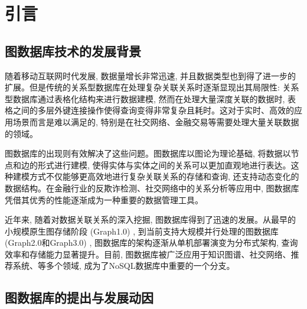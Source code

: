 \section{引言}

\subsection{图数据库技术的发展背景}

随着移动互联网时代发展, 数据量增长非常迅速, 并且数据类型也到得了进一步的扩展。但是传统的关系型数据库在处理复杂关联关系时逐渐显现出其局限性: 关系型数据库通过表格化结构来进行数据建模, 然而在处理大量深度关联的数据时, 表格之间的多层外键连接操作使得查询变得非常复杂且耗时。这对于实时、高效的应用场景而言是难以满足的, 特别是在社交网络、金融交易等需要处理大量关联数据的领域。

图数据库的出现则有效解决了这些问题。图数据库以图论为理论基础, 将数据以节点和边的形式进行建模, 使得实体与实体之间的关系可以更加直观地进行表达。这种建模方式不仅能够更高效地进行复杂关联关系的存储和查询, 还支持动态变化的数据结构。在金融行业的反欺诈检测、社交网络中的关系分析等应用中, 图数据库凭借其优秀的性能逐渐成为一种重要的数据管理工具。

近年来, 随着对数据关联关系的深入挖掘, 图数据库得到了迅速的发展。从最早的小规模原生图存储阶段 (Graph1.0) , 到当前支持大规模并行处理的图数据库 (Graph2.0和Graph3.0) , 图数据库的架构逐渐从单机部署演变为分布式架构, 查询效率和存储能力显著提升。目前, 图数据库被广泛应用于知识图谱、社交网络、推荐系统、等多个领域, 成为了NoSQL数据库中重要的一个分支。


\subsection{图数据库的提出与发展动因}

